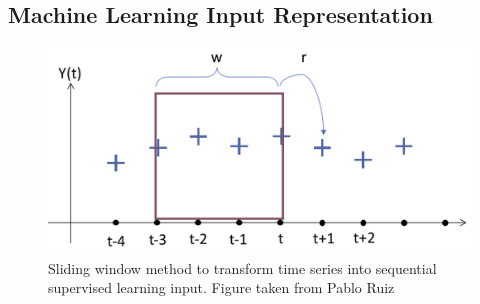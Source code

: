 \subsection{Machine Learning Input Representation}

\begin{figure}[t!]
    \centering
    \includegraphics[width=12cm]{pic/ch-Univariate/sliding.png}
    \caption{Sliding window method to transform time series into sequential supervised learning input. Figure taken from Pablo Ruiz}
    \label{fig:sliding}
\end{figure}

